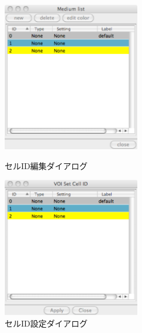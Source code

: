 \begin{enumerate}
\begin{figure}[htbp]
\begin{minipage}{.48\textwidth}
\begin{center}
\includegraphics[width=6cm,clip]{VXpp_Mlist.eps}
\end{center}
\caption{セルID編集ダイアログ}
\label{fig:V-Xpp Medium list}
\end{minipage} \hfill
\begin{minipage}{.48\textwidth}
\begin{center}
\includegraphics[width=6cm,clip]{VXpp_setID.eps}
\end{center}
\caption{セルID設定ダイアログ}
\label{fig:V-Xpp set cell ID}
\end{minipage}
\end{figure}


\end{enumerate}
